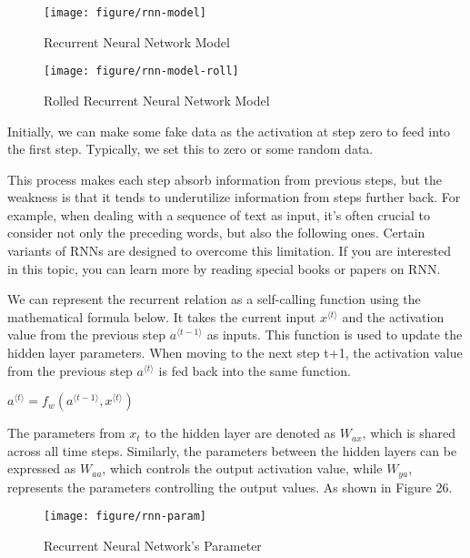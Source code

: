 \documentclass{article}
\begin{document}
\begin{figure}[htbp]
        \centering
        \texttt{[image: figure/rnn-model]}
        \caption{Recurrent Neural Network Model}
     \end{figure}


\begin{figure}[htbp]
        \centering
        \texttt{[image: figure/rnn-model-roll]}
        \caption{Rolled Recurrent Neural Network Model}
     \end{figure}

Initially, we can make some fake data as the activation at step zero to feed into the first step. Typically, we set this to zero or some random data.

This process makes each step absorb information from previous steps, but the weakness is that it tends to underutilize information from steps further back. For example, when dealing with a sequence of text as input, it's often crucial to consider not only the preceding words, but also the following ones. Certain variants of RNNs are designed to overcome this limitation. If you are interested in this topic, you can learn more by reading special books or papers on RNN.

We can represent the recurrent relation as a self-calling function using the mathematical formula below. It takes the current input $x^{\langle t\rangle}$ and the activation value from the previous step $a^{\langle {t-1}\rangle}$ as inputs. This function is used to update the hidden layer parameters. When moving to the next step t+1, the activation value from the previous step $a^{\langle t\rangle}$ is fed back into the same function.

\hspace*{\fill}

$a^{\langle t\rangle}=f_w\left(a^{\langle {t-1}\rangle}, x^{\langle t\rangle}\right)$\\
\hspace*{\fill}

The parameters from $x_t$ to the hidden layer are denoted as $W_{ax}$, which is shared across all time steps. Similarly, the parameters between the hidden layers can be expressed as $W_{aa}$, which controls the output activation value, while  $W_{ya}$, represents the parameters controlling the output values. As shown in Figure 26.

\begin{figure}[htbp]
        \centering
        \texttt{[image: figure/rnn-param]}
        \caption{Recurrent Neural Network's Parameter}
     \end{figure}
\end{document}
